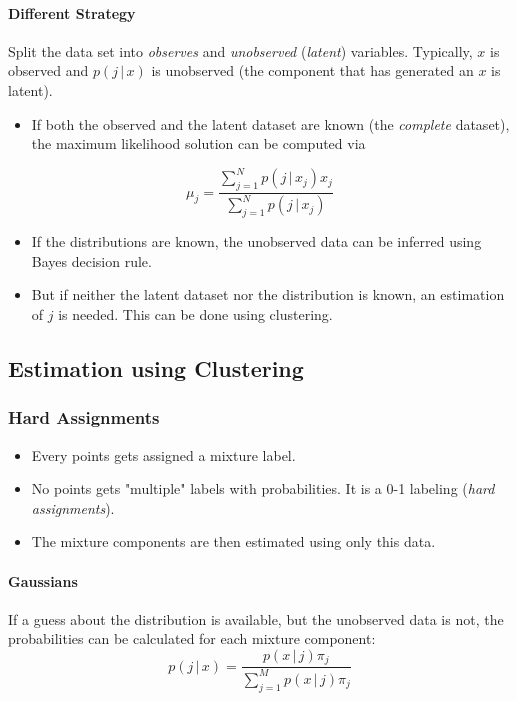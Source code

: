 \documentclass[a4paper, 11pt, accentcolor = tud3b]{tudreport}
\newcommand{\given}{\ensuremath{\,\vert\,}}
\begin{document}
					\paragraph{Different Strategy}
						Split the data set into \emph{observes} and \emph{unobserved} (\emph{latent}) variables. Typically, \(x\) is observed and \(p(j \given x)\) is unobserved (the component that has generated an \(x\) is latent).

						\begin{itemize}
							\item If both the observed and the latent dataset are known (the \emph{complete} dataset), the maximum likelihood solution can be computed via
						\end{itemize}
						\begin{equation}
							\mu_j = \frac{\sum_{j = 1}^{N} p(j \given x_j) x_j}{\sum_{j = 1}^{N} p(j \given x_j)}
						\end{equation}
						\begin{itemize}
							\item If the distributions are known, the unobserved data can be inferred using Bayes decision rule.
							\item But if neither the latent dataset nor the distribution is known, an estimation of \(j\) is needed. This can be done using clustering.
						\end{itemize}

			\subsection{Estimation using Clustering}
				\subsubsection{Hard Assignments}
					\begin{itemize}
						\item Every points gets assigned a mixture label.
						\item No points gets "multiple" labels with probabilities. It is a 0-1 labeling (\emph{hard assignments}).
						\item The mixture components are then estimated using only this data.
					\end{itemize}

					\paragraph{Gaussians}
						If a guess about the distribution is available, but the unobserved data is not, the probabilities can be calculated for each mixture component:
						\begin{equation}
							p(j \given x) = \frac{p(x \given j) \pi_j}{\sum_{j = 1}^{M} p(x \given j) \pi_j}
						\end{equation}
\end{document}

